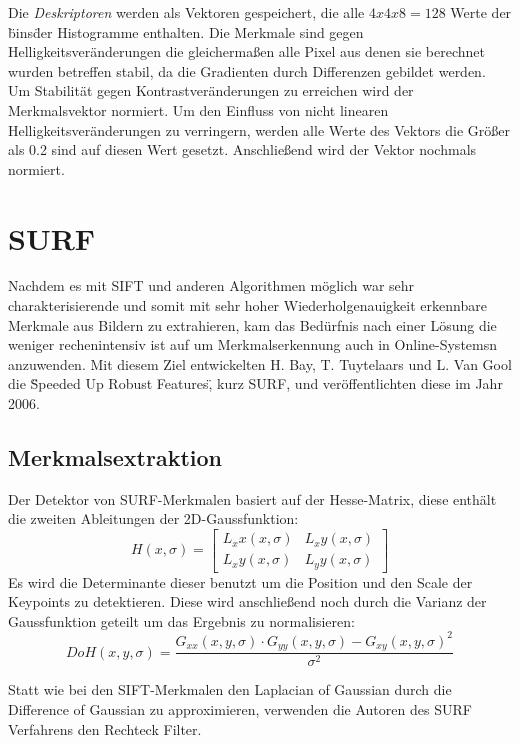 Die \emph{Deskriptoren} werden als Vektoren gespeichert, die alle $4x4x8=128$ Werte der \"bins\" der Histogramme enthalten. 
Die Merkmale sind gegen Helligkeitsveränderungen die gleichermaßen alle Pixel aus denen sie berechnet wurden betreffen stabil, da die Gradienten durch Differenzen gebildet werden.
Um Stabilität gegen Kontrastveränderungen zu erreichen wird der Merkmalsvektor normiert.
Um den Einfluss von nicht linearen Helligkeitsveränderungen zu verringern, werden alle Werte des Vektors die Größer als 0.2 sind auf diesen Wert gesetzt. Anschließend wird der Vektor nochmals normiert.


\section{SURF}

Nachdem es mit SIFT und anderen Algorithmen möglich war sehr charakterisierende und somit mit sehr hoher Wiederholgenauigkeit erkennbare Merkmale aus Bildern zu extrahieren, kam das Bedürfnis nach einer Lösung die weniger rechenintensiv ist auf um Merkmalserkennung auch in \Glspl{Online-System}n anzuwenden.
Mit diesem Ziel entwickelten H. Bay, T. Tuytelaars und L. Van Gool die \"Speeded Up Robust Features\", kurz SURF, und veröffentlichten diese im Jahr 2006.

\subsection{Merkmalsextraktion}

Der Detektor von SURF-Merkmalen basiert auf der Hesse-Matrix, diese enthält die zweiten Ableitungen der 2D-Gaussfunktion:
\begin{equation}
H(x, \sigma) =
\begin{bmatrix}
L_xx (x, \sigma) & L_xy (x, \sigma) \\
L_xy (x, \sigma) & L_yy (x, \sigma)
\end{bmatrix}
\end{equation}
Es wird die Determinante dieser benutzt um die Position und den Scale der Keypoints zu detektieren.
Diese wird anschließend noch durch die Varianz der Gaussfunktion geteilt um das Ergebnis zu normalisieren:
\begin{equation}
DoH(x, y, \sigma)=\dfrac{G_{xx}(x, y, \sigma)\cdot G_{yy}(x, y, \sigma)-G_{xy}(x, y, \sigma)^{2}}{\sigma^{2}}
\end{equation}

Statt wie bei den SIFT-Merkmalen den Laplacian of Gaussian durch die Difference of Gaussian zu approximieren, verwenden die Autoren des SURF Verfahrens den Rechteck Filter.

